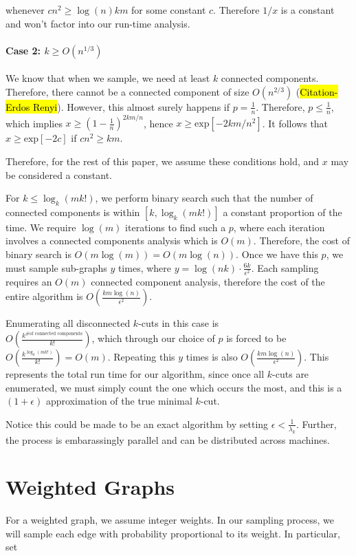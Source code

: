 \documentclass{acm_proc_article-sp}
\begin{document}
whenever $cn^2 \geq \log(n)km$ for some constant $c$. Therefore $1/x$ is a constant and won't factor into our run-time analysis.

\paragraph{Case 2: $k \geq O(n^{1/3})$} We know that when we sample, we need at least $k$ connected components. Therefore, there cannot be a connected component of size $O(n^{2/3})$ (\hl{Citation-Erdos Renyi}). However, this almost surely happens if $p = \frac{1}{n}$. Therefore, 
$p \leq \frac{1}{n}$, which implies $x \geq (1-\frac{1}{n})^{2km/n}$, hence $x \geq \textrm{exp}[-2km/n^2]$. It follows that 
$x \geq \textrm{exp}[-2c]$ if $cn^2 \geq km$.

Therefore, for the rest of this paper, we assume these conditions hold, and $x$ may be considered a constant.

For $k \leq \log_k(mk!)$, we perform binary search such that the number of connected components is within $[k, \log_k(mk!)]$ a constant proportion of the time. We require $\log(m)$ iterations to find such a $p$, where each iteration involves a connected components analysis which is $O(m)$. Therefore, the cost of binary search is $O(m \log(m)) = O(m \log(n))$. Once we have this $p$, we must sample sub-graphs $y$ times, where $y = \log(nk) \cdot \frac{6k}{\epsilon^2}$. Each sampling requires an $O(m)$ connected component analysis, therefore the cost of the entire algorithm is $O(\frac{km \log(n)}{\epsilon^2})$.

Enumerating all disconnected $k$-cuts in this case is \\ $O(\frac{k^{\text{\# of connected components}}}{k!})$, which through our choice of $p$ is forced to be $O(\frac{k^{\log_k(mk!)}}{k!}) = O(m)$. Repeating this $y$ times is also $O(\frac{km \log(n)}{\epsilon^2})$. This represents the total run time for our algorithm, since once all $k$-cuts are enumerated, we must simply count the one which occurs the most, and this is a $(1+\epsilon)$ approximation of the true minimal $k$-cut.

Notice this could be made to be an exact algorithm by setting $\epsilon < \frac{1}{\lambda_k}$. Further, the process is embarassingly parallel and can be distributed across machines.
\section{Weighted Graphs} For a weighted graph, we assume integer weights. In our sampling process, we will sample each edge with probability proportional to its weight. In particular, set
\end{document}
